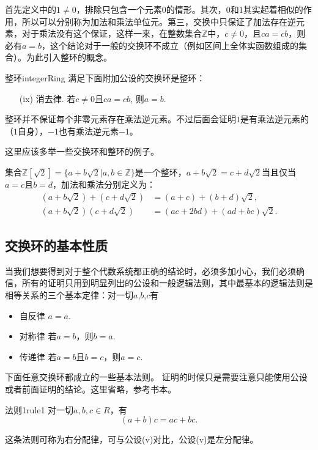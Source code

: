 首先定义中的$1 \neq 0$，排除只包含一个元素$0$的情形。其次，$0$和$1$其实起着相似的作用，所以可以分别称为加法和乘法单位元。第三，交换中只保证了加法存在逆元素，对于乘法没有这个保证，这样一来，在整数集合$\mathbb{Z}$中，$c \neq 0$，且$ca=cb$，则必有$a=b$，这个结论对于一般的交换环不成立（例如区间上全体实函数组成的集合）。为此引入整环的概念。
\begin{definition}{整环}{integerRing} 
满足下面附加公设的交换环是整环：
\begin{enumerate}
\item[(ix)] 消去律. 若$c \neq 0$且$ca=cb$, 则$a=b$.
\end{enumerate}
\end{definition}

整环并不保证每个非零元素存在乘法逆元素。不过后面会证明$1$是有乘法逆元素的（$1$自身），$-1$也有乘法逆元素$-1$。

这里应该多举一些交换环和整环的例子。

集合$\mathbb{Z}[\sqrt{2}] = \{a+b\sqrt{2} | a,b \in \mathbb{Z}\}$是一个整环，$a+b\sqrt{2}=c+d\sqrt{2}$当且仅当$a=c$且$b=d$，加法和乘法分别定义为：
\[
\begin{aligned}
(a + b\sqrt{2}) + (c + d\sqrt{2}) &= (a+c) + (b+d)\sqrt{2}, \\
(a + b\sqrt{2})(c + d\sqrt{2})&=(ac+2bd)+(ad+bc)\sqrt{2}.
\end{aligned}
\]


\subsection{交换环的基本性质}\label{subsection0010102}
当我们想要得到对于整个代数系统都正确的结论时，必须多加小心，我们必须确信，所有的证明只用到明显列出的公设和一般逻辑法则，其中最基本的逻辑法则是相等关系的三个基本定律：对一切$a$,$b$,$c$有
\begin{itemize}
\item 自反律 $a=a$.
\item 对称律 若$a=b$，则$b=a$.
\item 传递律 若$a=b$且$b=c$，则$a=c$.
\end{itemize}

下面任意交换环都成立的一些基本法则。 证明的时候只是需要注意只能使用公设或者前面证明的结论。这里省略，参考书本。

\begin{corollary}{法则1}{rule1}
对一切$a,b,c \in R$，有
\[
(a+b)c = ac + bc.
\]
\end{corollary}

这条法则可称为右分配律，可与公设(v)对比，公设(v)是左分配律。

